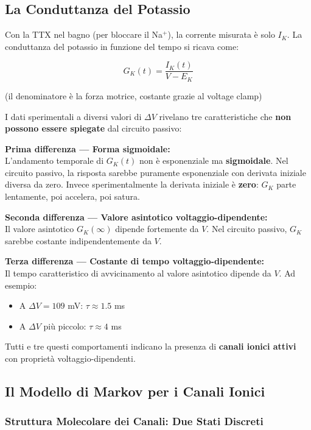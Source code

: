 \subsection{La Conduttanza del Potassio }


Con la TTX nel bagno (per bloccare il Na$^+$), la corrente misurata è solo $I_K$. La conduttanza del potassio in funzione del tempo si ricava come:

\begin{equation}
G_K(t) = \frac{I_K(t)}{V - E_K}
\end{equation}

(il denominatore è la forza motrice, costante grazie al voltage clamp)


I dati sperimentali a diversi valori di $\Delta V$ rivelano tre caratteristiche che \textbf{non possono essere spiegate} dal circuito passivo:

\textbf{Prima differenza — Forma sigmoidale:}\\
L'andamento temporale di $G_K(t)$ non è esponenziale ma \textbf{sigmoidale}. Nel circuito passivo, la risposta sarebbe puramente esponenziale con derivata iniziale diversa da zero. Invece sperimentalmente la derivata iniziale è \textbf{zero}: $G_K$ parte lentamente, poi accelera, poi satura.

\textbf{Seconda differenza — Valore asintotico voltaggio-dipendente:}\\
Il valore asintotico $G_K(\infty)$ dipende fortemente da $V$. Nel circuito passivo, $G_K$ sarebbe costante indipendentemente da $V$.

\textbf{Terza differenza — Costante di tempo voltaggio-dipendente:}\\
Il tempo caratteristico di avvicinamento al valore asintotico dipende da $V$. Ad esempio:
\begin{itemize}
    \item A $\Delta V = 109$ mV: $\tau \approx 1.5$ ms
    \item A $\Delta V$ più piccolo: $\tau \approx 4$ ms
\end{itemize}

Tutti e tre questi comportamenti indicano la presenza di \textbf{canali ionici attivi} con proprietà voltaggio-dipendenti.


\subsection{Il Modello di Markov per i Canali Ionici}

\subsubsection{Struttura Molecolare dei Canali: Due Stati Discreti}

